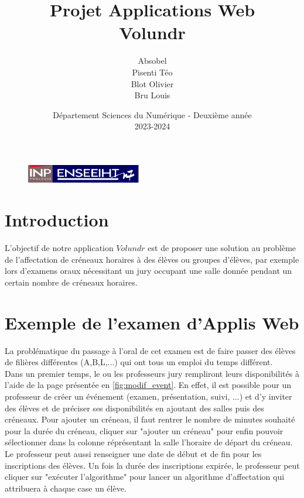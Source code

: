 \documentclass[french]{article}
\begin{document}
\begin{figure}[t]
\centering
\includegraphics[width=5cm]{rapport/inp_n7.png}
\end{figure}

\title{\vspace{4cm} \textbf{Projet Applications Web \\ Volundr}}
\author{Absobel\\ Pisenti Téo\\ Blot Olivier\\ Bru Louis\\ }
\date{\vspace{7cm} Département Sciences du Numérique - Deuxième année \\
2023-2024 }

\maketitle

\newpage

\section{Introduction}

    L'objectif de notre application $Volundr$ est de proposer une solution au problème de l'affectation de créneaux horaires à des élèves ou groupes d'élèves, par exemple lors d'examens oraux nécessitant un jury occupant une salle donnée pendant un certain nombre de créneaux horaires.


\section{Exemple de l'examen d'Applis Web}

    La problématique du passage à l'oral de cet examen est de faire passer des élèves de filières différentes (A,B,L,...) qui ont tous un emploi du temps différent.\\
    
    Dans un premier temps, le ou les professeurs jury rempliront leurs disponibilités à l'aide de la page présentée en \autoref{fig:modif_event}. En effet, il est possible pour un professeur de créer un événement (examen, présentation, suivi, ...) et d'y inviter des élèves et de préciser ses disponibilités en ajoutant des salles puis des créneaux. Pour ajouter un créneau, il faut rentrer le nombre de minutes souhaité pour la durée du créneau, cliquer sur "ajouter un créneau" pour enfin pouvoir sélectionner dans la colonne réprésentant la salle l'horaire de départ du créneau. Le professeur peut aussi renseigner une date de début et de fin pour les inscriptions des élèves. Un fois la durée des inscriptions expirée, le professeur peut cliquer sur "exécuter l'algorithme" pour lancer un algorithme d'affectation qui attribuera à chaque case un élève.\\
    
\end{document}
